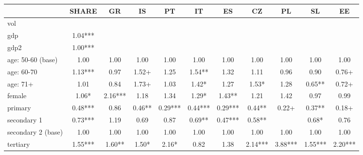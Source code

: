 {
\def\sym#1{\ifmmode^{#1}\else\(^{#1}\)\fi}
\begin{tabular}{l*{10}{c}}
\hline\hline
            &\multicolumn{1}{c}{SHARE}&\multicolumn{1}{c}{GR}&\multicolumn{1}{c}{IS}&\multicolumn{1}{c}{PT}&\multicolumn{1}{c}{IT}&\multicolumn{1}{c}{ES}&\multicolumn{1}{c}{CZ}&\multicolumn{1}{c}{PL}&\multicolumn{1}{c}{SL}&\multicolumn{1}{c}{EE}\\
\hline
vol         &               &               &               &               &               &               &               &               &               &               \\
gdp         &        1.04***&               &               &               &               &               &               &               &               &               \\
gdp2        &        1.00***&               &               &               &               &               &               &               &               &               \\
age: 50-60 (base)&        1.00   &        1.00   &        1.00   &        1.00   &        1.00   &        1.00   &        1.00   &        1.00   &        1.00   &        1.00   \\
age: 60-70  &        1.13***&        0.97   &        1.52+  &        1.25   &        1.54** &        1.32   &        1.11   &        0.96   &        0.90   &        0.76+  \\
age: 71+    &        1.01   &        0.84   &        1.73+  &        1.03   &        1.42*  &        1.27   &        1.53*  &        1.28   &        0.65** &        0.72+  \\
female      &        1.06*  &        2.16***&        1.18   &        1.34   &        1.29*  &        1.43** &        1.21   &        1.42   &        0.97   &        0.99   \\
primary     &        0.48***&        0.86   &        0.46** &        0.29***&        0.44***&        0.29***&        0.44** &        0.22+  &        0.37** &        0.18+  \\
secondary 1 &        0.73***&        1.19   &        0.69   &        0.87   &        0.69** &        0.47***&        0.58** &               &        0.68*  &        0.76   \\
secondary 2 (base)&        1.00   &        1.00   &        1.00   &        1.00   &        1.00   &        1.00   &        1.00   &        1.00   &        1.00   &        1.00   \\
tertiary    &        1.55***&        1.60** &        1.50*  &        2.16*  &        0.82   &        1.38   &        2.14***&        3.88***&        1.55***&        2.20***\\

\end{tabular}}
